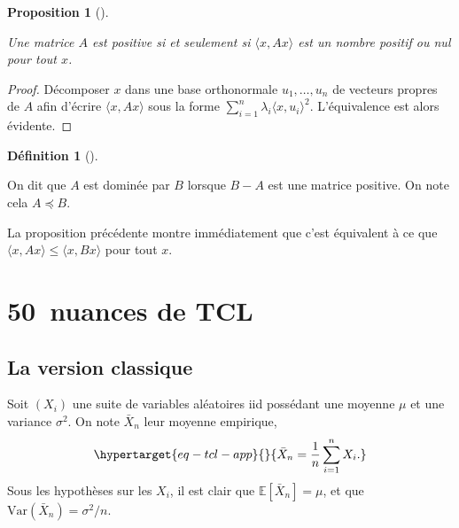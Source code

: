 \documentclass[
  10,
  letterpaper,
  DIV=11,
  numbers=noendperiod]{scrreport}
\theoremstyle{plain}
\theoremstyle{definition}
\theoremstyle{plain}
\newtheorem{proposition}{Proposition}[chapter]
\theoremstyle{definition}
\newtheorem{definition}{Définition}[chapter]
\theoremstyle{definition}
\theoremstyle{plain}
\theoremstyle{remark}
\begin{document}
\begin{proposition}[]\protect\hypertarget{prp-dp}{}\label{prp-dp}

Une matrice \(A\) est positive si et seulement si
\(\langle x, Ax\rangle\) est un nombre positif ou nul pour tout \(x\).

\end{proposition}

\begin{proof}

Décomposer \(x\) dans une base orthonormale \(u_1, \dotsc, u_n\) de
vecteurs propres de \(A\) afin d'écrire \(\langle x, Ax\rangle\) sous la
forme \(\sum_{i=1}^n \lambda_i \langle x, u_i\rangle^2\). L'équivalence
est alors évidente.

\end{proof}

\begin{definition}[]\protect\hypertarget{def-domination}{}\label{def-domination}

On dit que \(A\) est dominée par \(B\) lorsque \(B-A\) est une matrice
positive. On note cela \(A \preceq B\).

\end{definition}

La proposition précédente montre immédiatement que c'est équivalent à ce
que \(\langle x, Ax\rangle \leqslant \langle x, Bx\rangle\) pour tout
\(x\).


\hypertarget{sec-tcl}{%
\chapter{50~nuances de TCL}\label{sec-tcl}}

\hypertarget{la-version-classique}{%
\section{La version classique}\label{la-version-classique}}

Soit \((X_i)\) une suite de variables aléatoires iid possédant une
moyenne \(\mu\) et une variance \(\sigma^2\). On note \(\bar{X}_n\) leur
moyenne empirique,
\begin{equation}\protect\hypertarget{eq-tcl-app}{}{\bar{X}_n = \frac{1}{n}\sum_{i=1}^n X_i.}\label{eq-tcl-app}\end{equation}
Sous les hypothèses sur les \(X_i\), il est clair que
\(\mathbb{E}[\bar{X}_n] = \mu\), et que
\(\mathrm{Var}(\bar{X}_n) = \sigma^2/n\).
\end{document}
